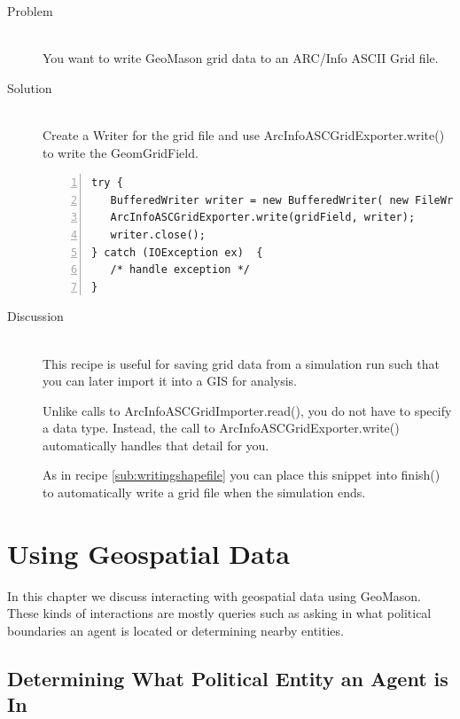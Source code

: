 \documentclass[twoside,10pt]{book}
\newcommand\method[1]{\textsf{#1}}
\newcommand\code[1]{\textsf{#1}}
\begin{document}
\begin{description}
\item[Problem]~\\
You want to write GeoMason grid data to an ARC/Info ASCII Grid file.

\item[Solution]~\\
Create a \code{Writer} for the grid file and use \code{ArcInfoASCGridExporter.write()} to write the \code{GeomGridField}.
\begin{Verbatim}[frame=lines,framesep=5mm,numbers=left,commandchars=+\[\]]
try {
   BufferedWriter writer = new BufferedWriter( new FileWriter("foo.asc") );
   ArcInfoASCGridExporter.write(gridField, writer);
   writer.close();
} catch (IOException ex)  {
   /* handle exception */
}
\end{Verbatim}

\item[Discussion] ~\\
This recipe is useful for saving grid data from a simulation run such
that you can later import it into a GIS for analysis.

Unlike calls to \method{ArcInfoASCGridImporter.read()}, you do not
have to specify a data type.  Instead, the call to
\method{ArcInfoASCGridExporter.write()} automatically handles that
detail for you.

As in recipe \ref{sub:writingshapefile} you can place this snippet into
\method{finish()} to automatically write a grid file when the
simulation ends.
\end{description}




\chapter{Using Geospatial Data}
\label{ch:using}

In this chapter we discuss interacting with geospatial data using
GeoMason.  These kinds of interactions are mostly queries such as
asking in what political boundaries an agent is located or determining
nearby entities.


\section{Determining What Political Entity an Agent is In}
\label{sec:politicalentity}
\end{document}
